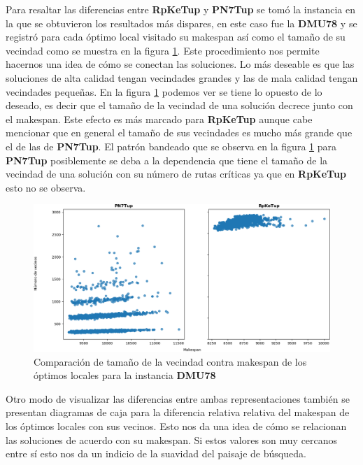 Para resaltar las diferencias entre \textbf{RpKeTup} y \textbf{PN7Tup} se tomó la instancia en la que se obtuvieron los resultados más dispares, en este caso fue la \textbf{DMU78} y se registró para cada óptimo local visitado su makespan así como el tamaño de su vecindad como se muestra en la figura \ref{fig:mattgraph}. Este procedimiento nos permite hacernos una idea de cómo se conectan las soluciones. Lo más deseable es que las soluciones de alta calidad tengan vecindades grandes y las de mala calidad tengan vecindades pequeñas. En la figura \ref{fig:mattgraph} podemos ver se tiene lo opuesto de lo deseado, es decir que el tamaño de la vecindad de una solución decrece junto con el makespan. Este efecto es más marcado para \textbf{RpKeTup} aunque cabe mencionar que en general el tamaño de sus vecindades es mucho más grande que el de las de \textbf{PN7Tup}. El patrón bandeado que se observa en la figura \ref{fig:mattgraph} para \textbf{PN7Tup} posiblemente se deba a la dependencia que tiene el tamaño de la vecindad de una solución con su número de rutas críticas ya que en \textbf{RpKeTup} esto no se observa.

\begin{figure}[hbtp]
    \includegraphics[scale=.6]{Imagenes/compvec78.png}
    \caption{Comparación de tamaño de la vecindad contra makespan de los óptimos locales para la instancia \textbf{DMU78} }
    \label{fig:mattgraph}
\end{figure}

Otro modo de visualizar las diferencias entre ambas representaciones también se presentan diagramas de caja para la diferencia relativa relativa del makespan de los óptimos locales con sus vecinos. Esto nos da una idea de cómo se relacionan las soluciones de acuerdo con su makespan. Si estos valores son muy cercanos entre sí esto nos da un indicio de la suavidad del paisaje de búsqueda.

